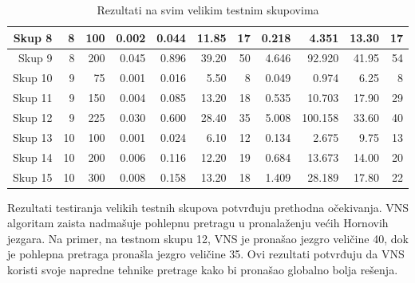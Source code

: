 \documentclass[12pt,oneside]{memoir}
\begin{document}
\begin{table}[H]
{\begin{tabular}{|r|r|r|rrrr|rrrr|}
Skup 8 & 8 & 100 & \multicolumn{1}{r|}{0.002} & \multicolumn{1}{r|}{0.044} & \multicolumn{1}{r|}{11.85} & 17 & \multicolumn{1}{r|}{0.218} & \multicolumn{1}{r|}{4.351} & \multicolumn{1}{r|}{13.30} & 17 \\ \hline
Skup 9 & 8 & 200 & \multicolumn{1}{r|}{0.045} & \multicolumn{1}{r|}{0.896} & \multicolumn{1}{r|}{39.20} & 50 & \multicolumn{1}{r|}{4.646} & \multicolumn{1}{r|}{92.920} & \multicolumn{1}{r|}{41.95} & 54 \\ \hline
Skup 10 & 9 & 75 & \multicolumn{1}{r|}{0.001} & \multicolumn{1}{r|}{0.016} & \multicolumn{1}{r|}{5.50} & 8 & \multicolumn{1}{r|}{0.049} & \multicolumn{1}{r|}{0.974} & \multicolumn{1}{r|}{6.25} & 8 \\ \hline
Skup 11 & 9 & 150 & \multicolumn{1}{r|}{0.004} & \multicolumn{1}{r|}{0.085} & \multicolumn{1}{r|}{13.20} & 18 & \multicolumn{1}{r|}{0.535} & \multicolumn{1}{r|}{10.703} & \multicolumn{1}{r|}{17.90} & 29 \\ \hline
Skup 12 & 9 & 225 & \multicolumn{1}{r|}{0.030} & \multicolumn{1}{r|}{0.600} & \multicolumn{1}{r|}{28.40} & 35 & \multicolumn{1}{r|}{5.008} & \multicolumn{1}{r|}{100.158} & \multicolumn{1}{r|}{33.60} & 40 \\ \hline
Skup 13 & 10 & 100 & \multicolumn{1}{r|}{0.001} & \multicolumn{1}{r|}{0.024} & \multicolumn{1}{r|}{6.10} & 12 & \multicolumn{1}{r|}{0.134} & \multicolumn{1}{r|}{2.675} & \multicolumn{1}{r|}{9.75} & 13 \\ \hline
Skup 14 & 10 & 200 & \multicolumn{1}{r|}{0.006} & \multicolumn{1}{r|}{0.116} & \multicolumn{1}{r|}{12.20} & 19 & \multicolumn{1}{r|}{0.684} & \multicolumn{1}{r|}{13.673} & \multicolumn{1}{r|}{14.00} & 20 \\ \hline
Skup 15 & 10 & 300 & \multicolumn{1}{r|}{0.008} & \multicolumn{1}{r|}{0.158} & \multicolumn{1}{r|}{13.20} & 18 & \multicolumn{1}{r|}{1.409} & \multicolumn{1}{r|}{28.189} & \multicolumn{1}{r|}{17.80} & 22 \\ \hline
\end{tabular}%
}
\caption{Rezultati na svim velikim testnim skupovima}
\label{tab:test_results}
\end{table}

Rezultati testiranja velikih testnih skupova potvrđuju prethodna očekivanja. VNS algoritam zaista nadmašuje pohlepnu pretragu u pronalaženju većih Hornovih jezgara. Na primer, na testnom skupu 12, VNS je pronašao jezgro veličine 40, dok je pohlepna pretraga pronašla jezgro veličine 35. Ovi rezultati potvrđuju da VNS koristi svoje napredne tehnike pretrage kako bi pronašao globalno bolja rešenja.
\end{document}

